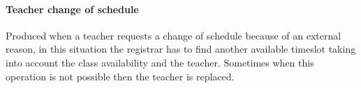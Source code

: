 \paragraph{Teacher change of schedule} Produced when a teacher requests a change of schedule because of an external reason, in this situation the registrar has to find another available timeslot taking into account the class availability and the teacher.
Sometimes when this operation is not possible then the teacher is replaced.
